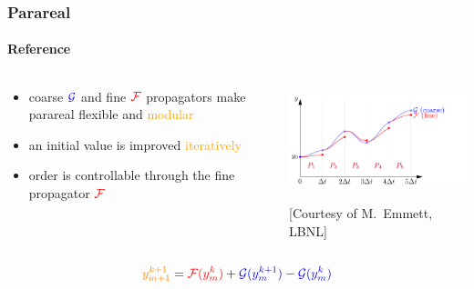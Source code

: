 \documentclass[%
  english,
  hyperref={pdfpagelabels=false},
  aspectratio=1610]{beamer}
\begin{document}
\begin{frame}
  \frametitle{Parareal}
  \framesubtitle{\scriptsize\normalfont Reference}
  \begin{columns}[T]
    \begin{column}{4cm}
      \begin{itemize}
	\item coarse $\mathcal{\textcolor{blue}{G}}$ and fine $\mathcal{\textcolor{red}{F}}$ propagators make parareal
	  flexible and \textcolor{orange}{modular}
	\item an initial value is improved \textcolor{orange}{iteratively}
	\item order is controllable through the fine propagator $\mathcal{\textcolor{red}{F}}$ 
      \end{itemize}
    \end{column}
    \begin{column}{8cm}
      \includegraphics[width=8cm]{src/parareal_overview}

      \vspace*{-0.2cm} \hfill {\tiny [Courtesy of M.~Emmett, LBNL]}\\[0.1cm]

  \end{column}
\end{columns}
              \begin{align*}
                  \textcolor{orange}{y_{m+1}^{k+1}} = \textcolor{red}{\mathcal{F}(y_m^k)} + \textcolor{blue}{\mathcal{G}(y_m^{k+1})} - \textcolor{blue}{\mathcal{G}(y_m^k)}
              \end{align*}

\end{frame}
\end{document}
